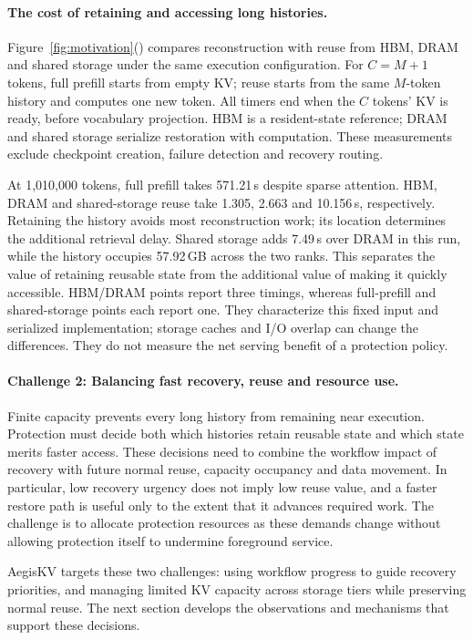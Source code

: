 \paragraph{The cost of retaining and accessing long histories.}
\label{sec:motivation-long-context}
Figure~\ref{fig:motivation}() compares
reconstruction with reuse from HBM, DRAM and shared storage under the
same execution configuration. For $C=M+1$ tokens, full prefill starts
from empty KV; reuse starts from the same $M$-token history and computes
one new token. All timers end when the $C$ tokens' KV is ready, before
vocabulary projection. HBM is a resident-state reference; DRAM and shared
storage serialize restoration with computation. These measurements
exclude checkpoint creation, failure detection and recovery routing.

At 1,010,000 tokens, full prefill takes 571.21\,s despite sparse attention.
HBM, DRAM and shared-storage reuse take 1.305, 2.663 and 10.156\,s,
respectively. Retaining the history avoids most reconstruction work;
its location determines the additional retrieval delay. Shared storage
adds 7.49\,s over DRAM in this run, while the history occupies 57.92\,GB
across the two ranks. This separates the value of retaining reusable
state from the additional value of making it quickly accessible.
HBM/DRAM points report three timings, whereas full-prefill and
shared-storage points each report one. They characterize this fixed
input and serialized implementation; storage caches and I/O overlap can
change the differences. They do not measure the net serving benefit
of a protection policy.

\paragraph{Challenge 2: Balancing fast recovery, reuse and resource use.}
Finite capacity prevents every long history from remaining near
execution. Protection must decide both which histories retain reusable
state and which state merits faster access. These decisions
need to combine the workflow impact of recovery with future normal reuse,
capacity occupancy and data movement. In particular, low recovery
urgency does not imply low reuse value, and a faster restore path is
useful only to the extent that it advances required work. The challenge
is to allocate protection resources as these demands change without
allowing protection itself to undermine foreground service.

\label{sec:motivation-goals}
AegisKV targets these two challenges: using workflow progress to guide
recovery priorities, and managing limited KV capacity across storage
tiers while preserving normal reuse. The next section develops the
observations and mechanisms that support these decisions.
